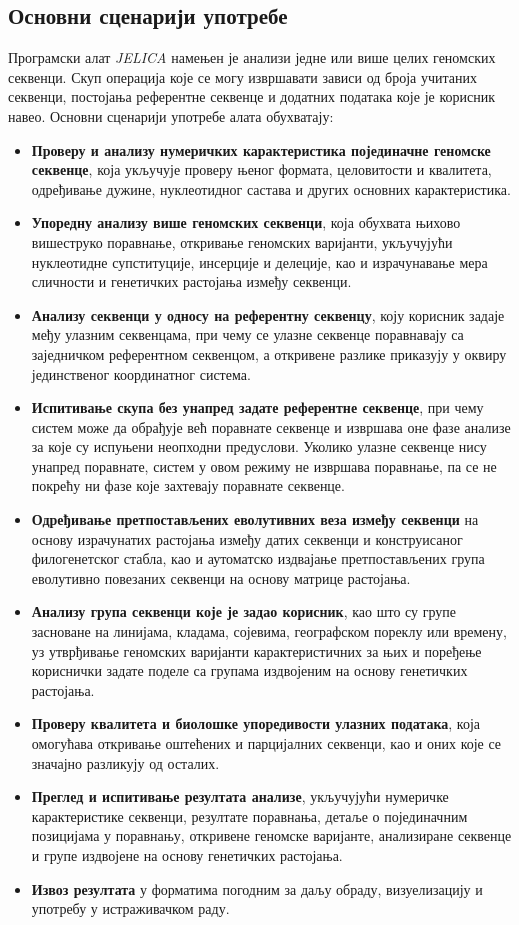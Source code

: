 \documentclass[12pt,oneside]{memoir}
\begin{document}
\subsection{Основни сценарији употребе}
\label{sec:basic-usage-scenarios}
Програмски алат \textit{JELICA} намењен је анализи једне или више целих геномских секвенци. Скуп операција које се могу извршавати зависи од броја учитаних секвенци, постојања референтне секвенце и додатних података које је корисник навео. Основни сценарији употребе алата обухватају:

\begin{itemize}
    \item \textbf{Проверу и анализу нумеричких карактеристика појединачне геномске секвенце}, која укључује проверу њеног формата, целовитости и квалитета, одређивање дужине, нуклеотидног састава и других основних карактеристика.
    \item \textbf{Упоредну анализу више геномских секвенци}, која обухвата њихово вишеструко поравнање, откривање геномских варијанти, укључујући нуклеотидне супституције, инсерције и делеције, као и израчунавање мера сличности и генетичких растојања између секвенци.
    \item \textbf{Анализу секвенци у односу на референтну секвенцу}, коју корисник задаје међу улазним секвенцама, при чему се улазне секвенце поравнавају са заједничком референтном секвенцом, а откривене разлике приказују у оквиру јединственог координатног система.
    \item \textbf{Испитивање скупа без унапред задате референтне секвенце}, при чему систем може да обрађује већ поравнате секвенце и извршава оне фазе анализе за које су испуњени неопходни предуслови. Уколико улазне секвенце нису унапред поравнате, систем у овом режиму не извршава поравнање, па се не покрећу ни фазе које захтевају поравнате секвенце.
    \item \textbf{Одређивање претпостављених еволутивних веза између секвенци} на основу израчунатих растојања између датих секвенци и конструисаног филогенетског стабла, као и аутоматско издвајање претпостављених група еволутивно повезаних секвенци на основу матрице растојања.
    \item \textbf{Анализу група секвенци које је задао корисник}, као што су групе засноване на линијама, кладама, сојевима, географском пореклу или времену, уз утврђивање геномских варијанти карактеристичних за њих и поређење кориснички задате поделе са групама издвојеним на основу генетичких растојања.
    \item \textbf{Проверу квалитета и биолошке упоредивости улазних података}, која омогућава откривање оштећених и парцијалних секвенци, као и оних које се значајно разликују од осталих.
    \item \textbf{Преглед и испитивање резултата анализе}, укључујући нумеричке карактеристике секвенци, резултате поравнања, детаље о појединачним позицијама у поравнању, откривене геномске варијанте, анализиране секвенце и групе издвојене на основу генетичких растојања.
    \item \textbf{Извоз резултата} у форматима погодним за даљу обраду, визуелизацију и употребу у истраживачком раду.
\end{itemize}
\end{document}

